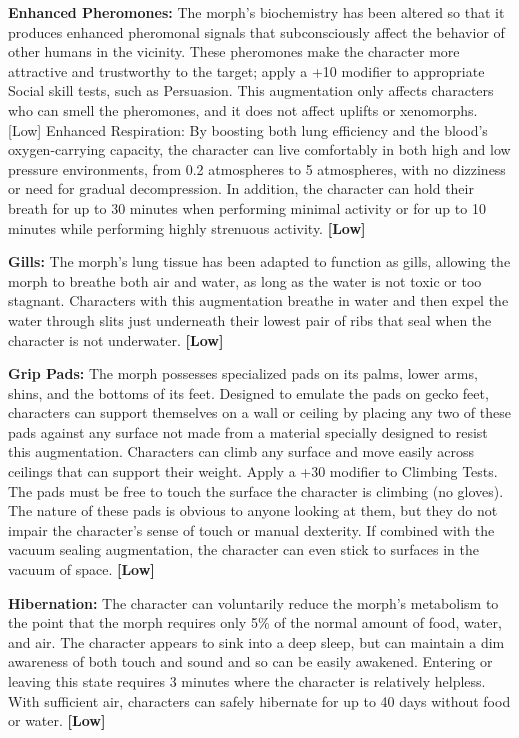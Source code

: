 \textbf{Enhanced Pheromones: }The morph’s biochemistry has been altered so that it produces enhanced pheromonal signals that subconsciously affect the behavior of other humans in the vicinity. These pheromones make the character more attractive and trustworthy to the target; apply a +10 modifier to appropriate Social skill tests, such as Persuasion. This augmentation only affects characters who can smell the pheromones, and it does not affect uplifts or xenomorphs. [Low] Enhanced Respiration: By boosting both lung efficiency and the blood’s oxygen-carrying capacity, the character can live comfortably in both high and low pressure environments, from 0.2 atmospheres to 5 atmospheres, with no dizziness or need for gradual decompression. In addition, the character can hold their breath for up to 30 minutes when performing minimal activity or for up to 10 minutes while performing highly strenuous activity. \textbf{[Low]}

\textbf{Gills:} The morph’s lung tissue has been adapted to function as gills, allowing the morph to breathe both air and water, as long as the water is not toxic or too stagnant. Characters with this augmentation breathe in water and then expel the water through slits just underneath their lowest pair of ribs that seal when the character is not underwater. \textbf{[Low]}

\textbf{Grip Pads:} The morph possesses specialized pads on its palms, lower arms, shins, and the bottoms of its feet. Designed to emulate the pads on gecko feet, characters can support themselves on a wall or ceiling by placing any two of these pads against any surface not made from a material specially designed to resist this augmentation. Characters can climb any surface and move easily across ceilings that can support their weight. Apply a +30 modifier to Climbing Tests. The pads must be free to touch the surface the character is climbing (no gloves). The nature of these pads is obvious to anyone looking at them, but they do not impair the character’s sense of touch or manual dexterity. If combined with the vacuum sealing augmentation, the character can even stick to surfaces in the vacuum of space. \textbf{[Low]}

\textbf{Hibernation:} The character can voluntarily reduce the morph’s metabolism to the point that the morph requires only 5\% of the normal amount of food, water, and air. The character appears to sink into a deep sleep, but can maintain a dim awareness of both touch and sound and so can be easily awakened. Entering or leaving this state requires 3 minutes where the character is relatively helpless. With sufficient air, characters can safely hibernate for up to 40 days without food or water. \textbf{[Low]}

